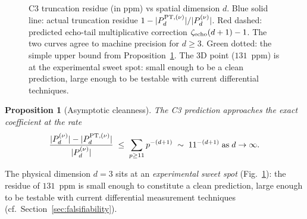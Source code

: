 \documentclass[11pt,a4paper]{article}
\newtheorem{proposition}{Proposition}
\begin{document}
\begin{figure}[ht]
\centering
{}
\caption{C3 truncation residue (in ppm) vs spatial dimension $d$. Blue solid line: actual
truncation residue $1 - |P_d^{{\rm PT},(\nu)}|/|P_d^{(\nu)}|$. Red dashed: predicted echo-tail
multiplicative correction $\zeta_{\rm echo}(d+1) - 1$. The two curves agree to machine
precision for $d \geq 3$. Green dotted: the simple upper bound from
Proposition~\ref{prop:asymptotic}. The 3D point ($131$~ppm) is at the experimental sweet
spot: small enough to be a clean prediction, large enough to be testable with current
differential techniques.}
\label{fig:c3-vs-d}
\end{figure}

\begin{proposition}[Asymptotic cleanness]
\label{prop:asymptotic}
The C3 prediction approaches the exact coefficient at the rate
\begin{equation}
\frac{|P_{d}^{(\nu)}| - |P_{d}^{{\rm PT},(\nu)}|}{|P_{d}^{(\nu)}|} \;\leq\; \sum_{p \geq 11} p^{-(d+1)} \;\sim\; 11^{-(d+1)}\;\text{as}\;d \to \infty.
\end{equation}
\end{proposition}

The physical dimension $d = 3$ sits at an \emph{experimental sweet spot} (Fig.~\ref{fig:c3-vs-d}):
the residue of $131$~ppm is small enough to constitute a clean prediction, large enough to be
testable with current differential measurement techniques (cf.\ Section~\ref{sec:falsifiability}).
\end{document}
